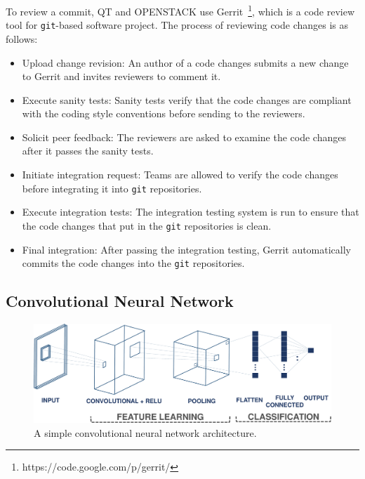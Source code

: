 To review a commit, QT and OPENSTACK use Gerrit~\footnote{https://code.google.com/p/gerrit/}, which is a code review tool for \texttt{git}-based software project. The process of reviewing code changes is as follows:
\begin{itemize}
    \item Upload change revision: An author of a code changes submits a new change to Gerrit and invites reviewers to comment it.
    \item Execute sanity tests: Sanity tests verify that the code changes are compliant with the coding style conventions before sending to the reviewers.
    \item Solicit peer feedback: The reviewers are asked to examine the code changes after it passes the sanity tests.
    \item Initiate integration request: Teams are allowed to verify the code changes before integrating it into \texttt{git} repositories.
    \item Execute integration tests: The integration testing system is run to ensure that the code changes that put in the \texttt{git} repositories is clean.
    \item Final integration: After passing the integration testing, Gerrit automatically commits the code changes into the \texttt{git} repositories.
\end{itemize}



\subsection{Convolutional Neural Network}
\label{sec:background_cnn}

\begin{figure}[t!]
	\center
	\includegraphics[scale=0.3]{figs/cnn.pdf}
	\caption{A simple convolutional neural network architecture.}
	\label{fig:cnn}
\end{figure}

